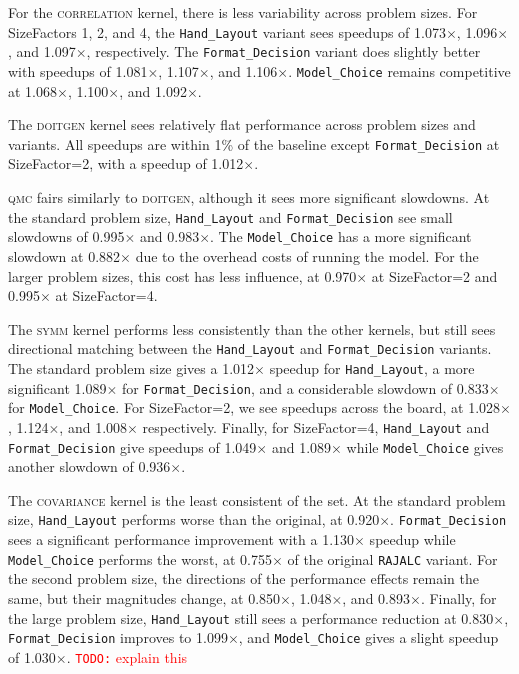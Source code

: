 \documentclass[sigconf,review=true]{acmart}
\newcommand{\todo}[1]{{\textcolor{red}{{\tt{TODO:}}\,\,#1 }}}
\begin{document}
For the \textsc{correlation} kernel, there is less variability across problem sizes. 
For SizeFactors 1, 2, and 4, the \verb.Hand_Layout. variant sees speedups of 1.073$\times$, 1.096$\times$, and 1.097$\times$, respectively. 
The \verb.Format_Decision. variant does slightly better with speedups of 1.081$\times$, 1.107$\times$, and 1.106$\times$.
\verb.Model_Choice. remains competitive at 1.068$\times$, 1.100$\times$, and 1.092$\times$.

The \textsc{doitgen} kernel sees relatively flat performance across problem sizes and variants. All speedups are within 1\% of the baseline except \verb.Format_Decision. at SizeFactor=2, with a speedup of 1.012$\times$. 

\textsc{qmc} fairs similarly to \textsc{doitgen}, although it sees more significant slowdowns. 
At the standard problem size, \verb.Hand_Layout. and \verb.Format_Decision. see small slowdowns of 0.995$\times$ and 0.983$\times$. 
The \verb.Model_Choice. has a more significant slowdown at 0.882$\times$ due to the overhead costs of running the model.
For the larger problem sizes, this cost has less influence, at 0.970$\times$ at SizeFactor=2 and 0.995$\times$ at SizeFactor=4. 

The \textsc{symm} kernel performs less consistently than the other kernels, but still sees directional matching between the \verb.Hand_Layout. and \verb.Format_Decision. variants. 
The standard problem size gives a 1.012$\times$ speedup for \verb.Hand_Layout., a more significant 1.089$\times$ for \verb.Format_Decision., and a considerable slowdown of 0.833$\times$ for \verb.Model_Choice.. 
For SizeFactor=2, we see speedups across the board, at 1.028$\times$, 1.124$\times$, and 1.008$\times$ respectively.
Finally, for SizeFactor=4, \verb.Hand_Layout. and \verb.Format_Decision. give speedups of 1.049$\times$ and 1.089$\times$ while \verb.Model_Choice. gives another slowdown of 0.936$\times$.

The \textsc{covariance} kernel is the least consistent of the set.
At the standard problem size, \verb.Hand_Layout. performs worse than the original, at 0.920$\times$. 
\verb.Format_Decision. sees a significant performance improvement with a 1.130$\times$ speedup while \verb.Model_Choice. performs the worst, at 0.755$\times$ of the original \verb.RAJALC. variant.
For the second problem size, the directions of the performance effects remain the same, but their magnitudes change, at 0.850$\times$, 1.048$\times$, and 0.893$\times$. 
Finally, for the large problem size, \verb.Hand_Layout. still sees a performance reduction at 0.830$\times$, \verb.Format_Decision. improves to 1.099$\times$, and \verb.Model_Choice. gives a slight speedup of 1.030$\times$.
\todo{explain this}
\end{document}
